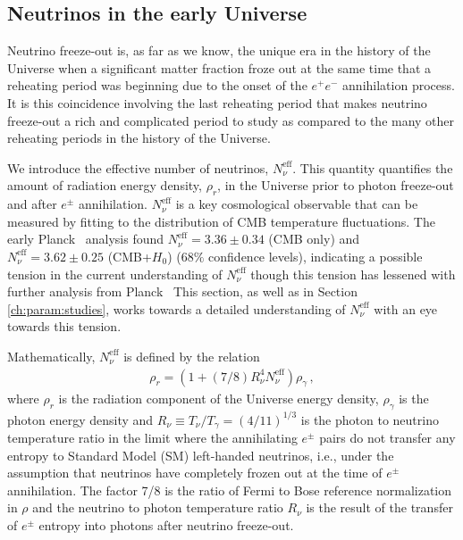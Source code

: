 \subsection{Neutrinos in the early Universe}
\label{sec:model:ind}

Neutrino freeze-out is, as far as we know, the unique era in the history of the Universe when a significant matter fraction froze out at the same time that a reheating period was beginning due to the onset of the $e^+e^-$ annihilation process. It is this coincidence involving the last reheating period that makes neutrino freeze-out a rich and complicated period to study as compared to the many other reheating periods in the history of the Universe. 


We introduce the effective number of neutrinos, $N^{\text{eff}}_\nu$. This quantity quantifies the amount of radiation energy density, $\rho_r$, in the Universe prior to photon freeze-out and after $e^\pm$ annihilation. $N^{\text{eff}}_\nu$ is a key cosmological observable that can be measured by fitting to the distribution of CMB temperature fluctuations. The early Planck~\cite{Planck:2013pxb} analysis found $N^{\text{eff}}_{\nu}=3.36\pm 0.34$ (CMB only) and $N^{\text{eff}}_{\nu}=3.62\pm 0.25$ (CMB+$H_0$) ($68\%$ confidence levels), indicating a possible tension in the current understanding of $N^{\text{eff}}_\nu$ though this tension has lessened with further analysis from Planck~\cite{Planck:2015fie,Planck:2018vyg} This section, as well as in Section \ref{ch:param:studies}, works towards a detailed understanding of $N^{\text{eff}}_{\nu}$ with an eye towards this tension.

Mathematically, $N^{\text{eff}}_\nu$ is defined by the relation
\begin{align}\label{eq:NeffDef}
\rho_r=\left(1+(7/8)R_\nu^{4}N^{\text{eff}}_\nu\right)\rho_\gamma\,,
\end{align}
where $\rho_r$ is the radiation component of the Universe energy density, $\rho_\gamma$ is the photon energy density and $R_\nu\equiv T_\nu/T_\gamma=({4}/{11})^{1/3}$ is the photon to neutrino temperature ratio in the limit where the annihilating $e^\pm$ pairs do not transfer any entropy to Standard Model (SM) left-handed neutrinos, i.e., under the assumption that neutrinos have completely frozen out at the time of $e^\pm$ annihilation. The factor 7/8 is the ratio of Fermi to Bose reference normalization in $\rho$ and the neutrino to photon temperature ratio $R_\nu$ is the result of the transfer of $e^\pm$ entropy into photons after neutrino freeze-out. 

